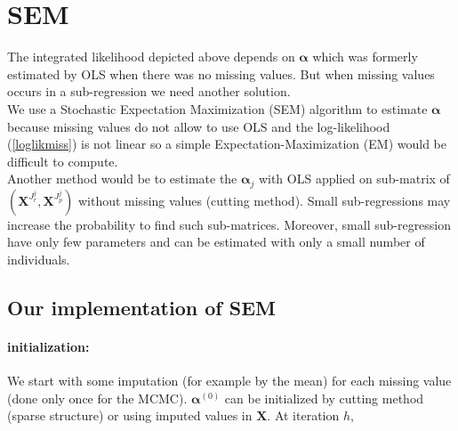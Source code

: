 \documentclass[12pt,a4paper]{report}
\begin{document}
%	
			
%	
\section{SEM}
	The integrated likelihood depicted above depends on $\boldsymbol{\alpha}$ which was formerly estimated by OLS when there was no missing values. But when missing values occurs in a sub-regression we need another solution.\\
	
	We use a  Stochastic Expectation Maximization (SEM) algorithm \cite{celeux1986algorithme} to estimate $\boldsymbol{\alpha}$ because missing values do not allow to use OLS and  the log-likelihood (\ref{loglikmiss}) is not linear so a simple Expectation-Maximization (EM) would be difficult to compute.\\
	
	Another method would be to estimate the $\boldsymbol{\alpha}_j$ with OLS applied on sub-matrix of $(\boldsymbol{X}^{J_r^j},\boldsymbol{X}^{J_p^j})$ without missing values (cutting method). Small sub-regressions may increase the probability to find such sub-matrices. Moreover, small sub-regression have only few parameters and can be estimated with only a small number of individuals.
		
	\subsection{Our implementation of SEM}
	\paragraph{initialization:} We start with some imputation (for example by the mean) for each missing value (done only once for the MCMC). $\boldsymbol{\alpha}^{(0)}$ can be initialized by cutting method	(sparse structure) or using imputed values in $\boldsymbol{X}$.
	At iteration $h$,
\end{document}
